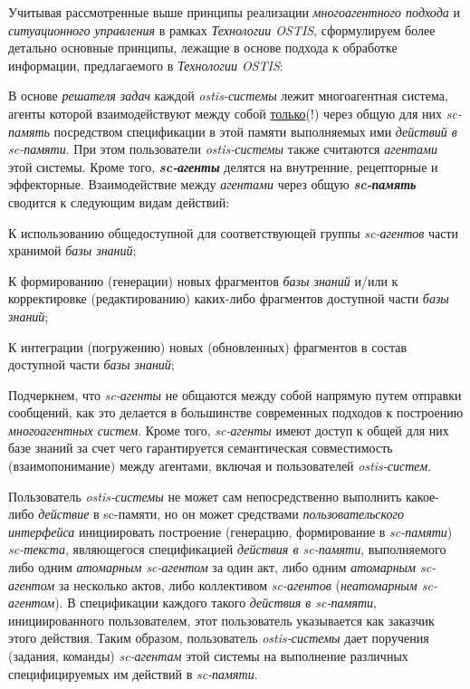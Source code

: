 Учитывая рассмотренные выше принципы реализации \textit{многоагентного подхода} и \textit{ситуационного управления} в рамках \textit{Технологии OSTIS}, сформулируем более детально основные принципы, лежащие в основе подхода к обработке информации, предлагаемого в \textit{Технологии OSTIS}:

\begin{textitemize}
	\item В основе \textit{решателя задач} каждой \textit{ostis-системы} лежит многоагентная система, агенты которой взаимодействуют между собой \uline{только}(!) через общую для них \textit{sc-память} посредством спецификации в этой памяти выполняемых ими \textit{действий в sc-памяти}. При этом пользователи \textit{ostis-системы} также считаются \textit{агентами} этой системы. Кроме того, \textbf{\textit{sc-агенты}} делятся на внутренние, рецепторные и эффекторные. Взаимодействие между \textit{агентами} через общую \textbf{\textit{sc-память}} сводится к следующим видам действий:
	\begin{textitemize}
		\item К использованию общедоступной для соответствующей группы \textit{sc-агентов} части хранимой \textit{базы знаний};
		\item К формированию (генерации) новых фрагментов \textit{базы знаний} и/или к корректировке (редактированию) каких-либо фрагментов доступной части \textit{базы знаний};
		\item К интеграции (погружению) новых (обновленных) фрагментов в состав доступной части \textit{базы знаний};
	\end{textitemize}
	\vspace{-2\parskip}
	Подчеркнем, что \textit{sc-агенты} не общаются между собой напрямую путем отправки сообщений, как это делается в большинстве современных подходов к построению \textit{многоагентных систем}. Кроме того, \textit{sc-агенты} имеют доступ к общей для них базе знаний за счет чего гарантируется семантическая совместимость (взаимопонимание) между агентами, включая и пользователей \textit{ostis-систем}.
	\vspace{\parskip}
	\item Пользователь \textit{ostis-системы} не может сам непосредственно выполнить какое-либо \textit{действие} в \mbox{sc-памяти}, но он может средствами \textit{пользовательского интерфейса} инициировать построение (генерацию, формирование в \textit{sc-памяти}) \textit{sc-текста}, являющегося спецификацией \textit{действия в \mbox{sc-памяти}}, выполняемого либо одним \textit{атомарным sc-агентом} за один акт, либо одним \textit{атомарным sc-агентом} за несколько актов, либо коллективом \textit{sc-агентов} (\textit{неатомарным sc-агентом}). В спецификации каждого такого \textit{действия в sc-памяти}, инициированного пользователем, этот пользователь указывается как заказчик этого действия. Таким образом, пользователь \textit{ostis-системы} дает поручения (задания, команды) \textit{sc-агентам} этой системы на выполнение различных специфицируемых им действий в \textit{sc-памяти}.
	

\end{textitemize}

